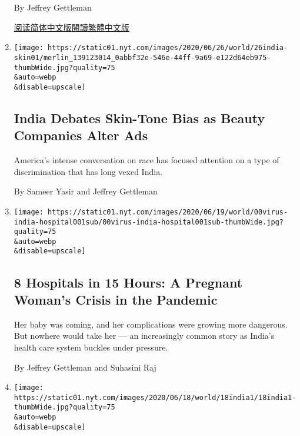 \begin{enumerate}
  By Jeffrey Gettleman

  \href{https://cn.nytimes.com/world/20200713/india-china-border-ladakh/}{阅读简体中文版}\href{https://cn.nytimes.com/world/20200713/india-china-border-ladakh/zh-hant/}{閱讀繁體中文版}
\item
  \href{/2020/06/28/world/asia/india-skin-color-unilever.html}{}

  \texttt{[image: https://static01.nyt.com/images/2020/06/26/world/26india-skin01/merlin\_139123014\_0abbf32e-546e-44ff-9a69-e122d64eb975-thumbWide.jpg?quality=75\\\&auto=webp\\\&disable=upscale]}

  \hypertarget{india-debates-skin-tone-bias-as-beauty-companies-alter-ads}{%
  \subsection{India Debates Skin-Tone Bias as Beauty Companies Alter
  Ads}\label{india-debates-skin-tone-bias-as-beauty-companies-alter-ads}}

  America's intense conversation on race has focused attention on a type
  of discrimination that has long vexed India.

  By Sameer Yasir and Jeffrey Gettleman
\item
  \href{/2020/06/21/world/asia/coronavirus-india-hospitals-pregnant.html}{}

  \texttt{[image: https://static01.nyt.com/images/2020/06/19/world/00virus-india-hospital001sub/00virus-india-hospital001sub-thumbWide.jpg?quality=75\\\&auto=webp\\\&disable=upscale]}

  \hypertarget{8-hospitals-in-15-hours-a-pregnant-womans-crisis-in-the-pandemic}{%
  \subsection{8 Hospitals in 15 Hours: A Pregnant Woman's Crisis in the
  Pandemic}\label{8-hospitals-in-15-hours-a-pregnant-womans-crisis-in-the-pandemic}}

  Her baby was coming, and her complications were growing more
  dangerous. But nowhere would take her --- an increasingly common story
  as India's health care system buckles under pressure.

  By Jeffrey Gettleman and Suhasini Raj
\item
  \href{/2020/06/18/world/asia/india-china-border.html}{}

  \texttt{[image: https://static01.nyt.com/images/2020/06/18/world/18india1/18india1-thumbWide.jpg?quality=75\\\&auto=webp\\\&disable=upscale]}


\end{enumerate}
